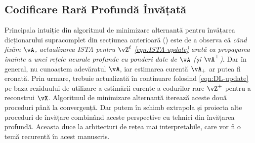 \documentclass[../../book-main_ro.tex]{subfiles}
\begin{document}
\subsection{Codificare Rară Profundă Învățată}
\label{sec:LISTA}
Principala intuiție din algoritmul de minimizare alternantă pentru
învățarea dicționarului supracomplet din secțiunea anterioară
() este de a observa că \textit{când fixăm
\(\vA\), actualizarea ISTA pentru $\vZ^\ell$ \eqref{eqn:ISTA-update} arată ca
propagarea înainte a unei rețele neurale profunde cu ponderi date de \(\vA\) (și
\(\vA^{\top}\))}. Dar în general, nu cunoaștem adevăratul $\vA$, iar estimarea
curentă $\vA_+$ ar putea fi eronată. Prin urmare, trebuie actualizată în continuare folosind
\eqref{eqn:DL-update} pe baza reziduului de utilizare a estimării curente a
codurilor rare $\vZ^+$ pentru a reconstrui $\vX$. Algoritmul de minimizare
alternantă iterează aceste două proceduri până la convergență. Dar putem în schimb
extrapola și proiecta alte proceduri de învățare combinând aceste perspective
cu tehnici din învățarea profundă. Aceasta duce la arhitecturi de rețea mai interpretabile,
care vor fi o temă recurentă în acest manuscris.
\end{document}
